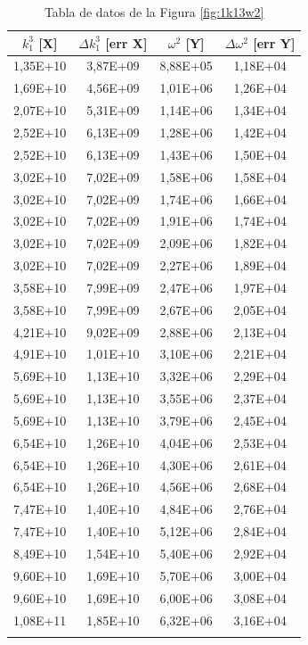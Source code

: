 \documentclass[a4paper,12pt,spanish]{article}
\begin{document}
\begin{longtable}[c]{|c|c|c|c|}
	\hline
	$k_1^3$ [X] & $\Delta k_1^3$ [err X] & $\omega^2$ [Y]& $\Delta \omega^2$ [err Y] \\ \hline\hline
	\endfirsthead
	\endhead
	1,35E+10 & 3,87E+09 & 8,88E+05 & 1,18E+04 \\ \hline
	1,69E+10 & 4,56E+09 & 1,01E+06 & 1,26E+04 \\ \hline
	2,07E+10 & 5,31E+09 & 1,14E+06 & 1,34E+04 \\ \hline
	2,52E+10 & 6,13E+09 & 1,28E+06 & 1,42E+04 \\ \hline
	2,52E+10 & 6,13E+09 & 1,43E+06 & 1,50E+04 \\ \hline
	3,02E+10 & 7,02E+09 & 1,58E+06 & 1,58E+04 \\ \hline
	3,02E+10 & 7,02E+09 & 1,74E+06 & 1,66E+04 \\ \hline
	3,02E+10 & 7,02E+09 & 1,91E+06 & 1,74E+04 \\ \hline
	3,02E+10 & 7,02E+09 & 2,09E+06 & 1,82E+04 \\ \hline
	3,02E+10 & 7,02E+09 & 2,27E+06 & 1,89E+04 \\ \hline
	3,58E+10 & 7,99E+09 & 2,47E+06 & 1,97E+04 \\ \hline
	3,58E+10 & 7,99E+09 & 2,67E+06 & 2,05E+04 \\ \hline
	4,21E+10 & 9,02E+09 & 2,88E+06 & 2,13E+04 \\ \hline
	4,91E+10 & 1,01E+10 & 3,10E+06 & 2,21E+04 \\ \hline
	5,69E+10 & 1,13E+10 & 3,32E+06 & 2,29E+04 \\ \hline
	5,69E+10 & 1,13E+10 & 3,55E+06 & 2,37E+04 \\ \hline
	5,69E+10 & 1,13E+10 & 3,79E+06 & 2,45E+04 \\ \hline
	6,54E+10 & 1,26E+10 & 4,04E+06 & 2,53E+04 \\ \hline
	6,54E+10 & 1,26E+10 & 4,30E+06 & 2,61E+04 \\ \hline
	6,54E+10 & 1,26E+10 & 4,56E+06 & 2,68E+04 \\ \hline
	7,47E+10 & 1,40E+10 & 4,84E+06 & 2,76E+04 \\ \hline
	7,47E+10 & 1,40E+10 & 5,12E+06 & 2,84E+04 \\ \hline
	8,49E+10 & 1,54E+10 & 5,40E+06 & 2,92E+04 \\ \hline
	9,60E+10 & 1,69E+10 & 5,70E+06 & 3,00E+04 \\ \hline
	9,60E+10 & 1,69E+10 & 6,00E+06 & 3,08E+04 \\ \hline
	1,08E+11 & 1,85E+10 & 6,32E+06 & 3,16E+04 \\ \hline
	\caption{Tabla de datos de la Figura \ref{fig:1k13w2}}
\end{longtable}
\end{document}
